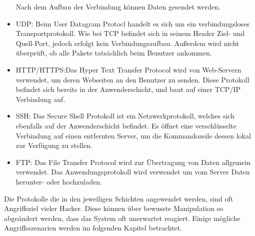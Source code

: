 \begin{itemize}
Nach dem Aufbau der Verbindung können Daten gesendet werden.

\item UDP: Beim User Datagram Protocl handelt es sich um ein verbindungsloses Transportprotokoll. Wie bei TCP befindet sich in seinem Header Ziel- und Quell-Port, jedoch erfolgt kein Verbindungsaufbau. Außerdem wird nicht überprüft, ob alle Pakete tatsächlich beim Benutzer ankommen. 
\item HTTP/HTTPS:Das Hyper Text Transfer Protocol wird von Web-Servern verwendet, um deren Webseiten an den Benutzer zu senden. Diese Protokoll befindet sich bereits in der Anwenderschicht, und baut auf einer TCP/IP Verbindung auf.
\item SSH: Das Secure Shell Protokoll ist ein Netzwerkprotokoll, welches sich ebenfalls auf der Anwenderschicht befindet. Es öffnet eine verschlüsselte Verbindung auf einen entfernten Server, um die Kommandozeile dessen lokal zur Verfügung zu stellen. 
\item FTP: Das File Transfer Protocol wird zur Übertragung von Daten allgemein verwendet. Das Anwendungsprotokoll wird verwendet um vom Server Daten herunter- oder hochzuladen. 
\end{itemize}

\noindent Die Protokolle die in den jeweiligen Schichten angewendet werden, sind oft Angriffsziel vieler Hacker. Diese können über bewusste Manipulation so abgeändert werden, dass das System oft unerwartet reagiert. Einige mögliche Angriffsszenarien werden im folgenden Kapitel betrachtet. 